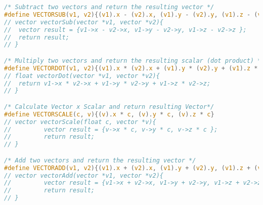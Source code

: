 \documentclass[12pt]{article}
\begin{document}
\begin{lstlisting}[language=c, caption=Macro Functions]
/* Subtract two vectors and return the resulting vector */
#define VECTORSUB(v1, v2){(v1).x - (v2).x, (v1).y - (v2).y, (v1).z - (v2).z}
// vector vectorSub(vector *v1, vector *v2){
//  vector result = {v1->x - v2->x, v1->y - v2->y, v1->z - v2->z };
//  return result;
// }

/* Multiply two vectors and return the resulting scalar (dot product) */
#define VECTORDOT(v1, v2){(v1).x * (v2).x + (v1).y * (v2).y + (v1).z * (v2).z}
// float vectorDot(vector *v1, vector *v2){
//  return v1->x * v2->x + v1->y * v2->y + v1->z * v2->z;
// }

/* Calculate Vector x Scalar and return resulting Vector*/ 
#define VECTORSCALE(c, v){(v).x * c, (v).y * c, (v).z * c}
// vector vectorScale(float c, vector *v){
//         vector result = {v->x * c, v->y * c, v->z * c };
//         return result;
// }

/* Add two vectors and return the resulting vector */
#define VECTORADD(v1, v2){(v1).x + (v2).x, (v1).y + (v2).y, (v1).z + (v2).z}
// vector vectorAdd(vector *v1, vector *v2){
//         vector result = {v1->x + v2->x, v1->y + v2->y, v1->z + v2->z };
//         return result;
// }
\end{lstlisting}
\end{document}
